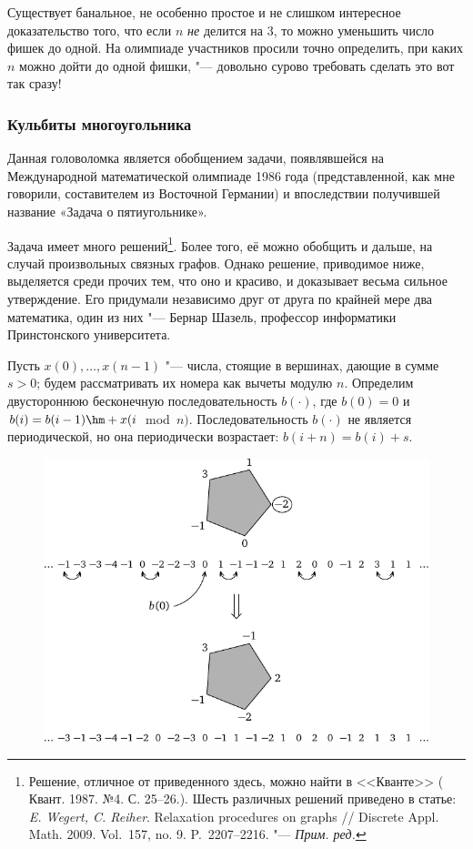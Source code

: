 \documentclass[twoside]{book}
\begin{document}
\medskip
Существует банальное, не особенно простое и не слишком интересное 
доказательство того, что если $n$ \emph{не} делится на $3$, то можно уменьшить число фишек до одной.
На олимпиаде участников просили точно определить, при каких $n$ можно
дойти до одной фишки, "--- довольно сурово требовать сделать это вот так сразу!

\subsubsection*{Кульбиты многоугольника}%

Данная головоломка является обобщением задачи, появлявшейся на Международной математической олимпиаде 1986 года (представленной, как мне говорили, составителем из Восточной Германии) и впоследствии получившей название «Задача о пятиугольнике».

Задача имеет много решений\footnote{Решение, отличное от приведенного здесь, можно найти в <<Кванте>> (%
Квант. 1987. №4. С. 25--26.).
Шесть различных решений приведено в статье: \emph{E. Wegert, C. Reiher}. Relaxation procedures on graphs /\!/ Discrete Appl. Math. 2009. Vol.~157, no. 9. P.~2207--2216. "--- \emph{Прим. ред.}}.
Более того, её можно обобщить и дальше, на случай произвольных связных графов.
Однако решение, приводимое ниже, выделяется среди прочих тем, что оно
и красиво, и доказывает весьма сильное утверждение.
Его придумали независимо друг от друга по крайней мере два математика, один из них "--- Бернар Шазель, профессор информатики Принстонского университета. %

\medskip

Пусть $x(0),\dots,x(n-1)$ "--- числа, стоящие в вершинах, дающие в
сумме $s > 0$; будем рассматривать их номера как вычеты модулю $n$.
Определим двустороннюю бесконечную последовательность
$b(\cdot)$, где $b(0) = 0$ и $b(i) = b(i -1) \hm+ x(i$~mod~${n})$.
Последовательность $b(\cdot)$ не является периодической, но она периодически возрастает: $b(i + n) = b(i) + s$.

\begin{figure}[h]
\centering
\includegraphics{mp/wink-200}
\end{figure}
\end{document}
